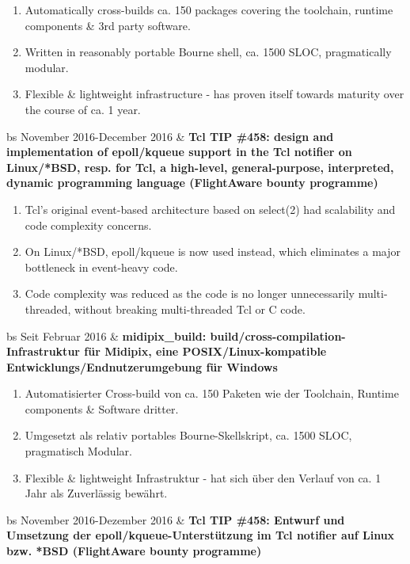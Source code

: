 \documentclass{article}
\begin{document}
\begin{table}
{\begin{enumerate}
      \item Automatically cross-builds ca. 150 packages covering the toolchain, runtime components \& 3rd party software.
      \item Written in reasonably portable Bourne shell, ca. 1500 SLOC, pragmatically modular.
      \item Flexible \& lightweight infrastructure - has proven itself towards maturity over the course of ca. 1 year.
    \end{enumerate}
    \begin{tabularx}{\linewidth}{bs}
      November 2016-December 2016 & \bf{Tcl TIP \#458: design and implementation of epoll/kqueue support in the Tcl notifier on Linux/*BSD, resp. for Tcl, a high-level, general-purpose, interpreted, dynamic programming language (FlightAware bounty programme)}
    \end{tabularx}
    \begin{enumerate}
      \item Tcl's original event-based architecture based on select(2) had scalability and code complexity concerns.
      \item On Linux/*BSD, epoll/kqueue is now used instead, which eliminates a major bottleneck in event-heavy code.
      \item Code complexity was reduced as the code is no longer unnecessarily multi-threaded, without breaking multi-threaded Tcl or C code.
    \end{enumerate}
  }{
    \caption{Projektbeteiligungen}
    \begin{tabularx}{\linewidth}{bs}
      Seit Februar 2016 & \bf{midipix\_build: build/cross-compilation-Infrastruktur für Midipix, eine POSIX/Linux-kompatible Entwicklungs/Endnutzerumgebung für Windows}
    \end{tabularx}
    \begin{enumerate}
      \item Automatisierter Cross-build von ca. 150 Paketen wie der Toolchain, Runtime components \& Software dritter.
      \item Umgesetzt als relativ portables Bourne-Skellskript, ca. 1500 SLOC, pragmatisch Modular.
      \item Flexible \& lightweight Infrastruktur - hat sich über den Verlauf von ca. 1 Jahr als Zuverlässig bewährt.
    \end{enumerate}
    \begin{tabularx}{\linewidth}{bs}
      November 2016-Dezember 2016 & \bf{Tcl TIP \#458: Entwurf und Umsetzung der epoll/kqueue-Unterstützung im Tcl notifier auf Linux bzw. *BSD (FlightAware bounty programme)}

\end{tabularx}}
\end{table}
\end{document}
